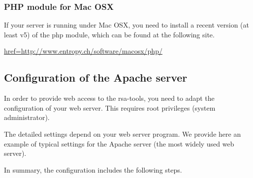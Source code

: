 \documentclass[12pt,a4paper, twoside]{scrreprt} %
\begin{document}
\subsubsection{PHP module for Mac OSX}

If your server is running under Mac OSX, you need to install a recent
version (at least v5) of the php module, which can be found at the following site. 

\url{href=http://www.entropy.ch/software/macosx/php/}

\subsection{Configuration of the Apache server}

In order to provide web access to the rsa-tools, you need to adapt the
configuration of your web server. This requires root privileges
(system administrator). 


The detailed settings depend on your web server program. We provide
here an example of typical settings for the Apache server (the most
widely used web server).

In summary, the configuration includes the following steps.
\end{document}
